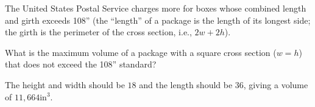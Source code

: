 {The United States Postal Service charges more for boxes whose combined length and girth exceeds 108'' (the ``length'' of a package is the length of its longest side; the girth is the perimeter of the cross section, i.e., $2w+2h$). 

What is the maximum volume of a package with a square cross section ($w=h$) that does not exceed the 108'' standard? 
}
{The height and width should be $18$ and the length should be $36$, giving a volume of $11,664$in$^3$.
}


